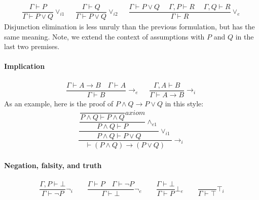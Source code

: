 \begin{align*}
\dfrac{\Gamma \vdash P}
      {\Gamma \vdash P \vee Q}  {\vee_{i1}}
\quad\;
\dfrac{\Gamma \vdash Q}
      {\Gamma \vdash P \vee Q} {\vee_{i2}}
\quad\;
\dfrac{\Gamma \vdash P \vee Q
  \quad\; \Gamma, P \vdash R
  \quad\; \Gamma, Q \vdash R}
      {\Gamma \vdash R} {\vee_{e}}
\end{align*}
%
Disjunction elimination is less unruly than the previous
formulation, but has the same meaning. Note, we extend the
context of assumptions with $P$ and $Q$ in the last two premises.

\paragraph{Implication}

\begin{align*}
\dfrac{\Gamma \vdash A \rightarrow B \quad \Gamma \vdash A}
      {\Gamma \vdash B} {\rightarrow_e}
\quad\;
\dfrac{\Gamma, A \vdash B}{\Gamma \vdash A \rightarrow B}
 {\rightarrow_i}
\end{align*}
As an example, here is the proof of $P \wedge Q \rightarrow P \vee Q$
in this style:
%
\newcommand{\pAB}{\dfrac{}{P \wedge Q \vdash P \wedge Q} {\textit{axiom}}}
\begin{align*}
  \dfrac{
  \dfrac{\dfrac{\pAB}{P \wedge Q \vdash P} {\wedge_{e1}}}
  {P \wedge Q \vdash P \vee Q} {\vee_{i1}}}
  {\vdash (P \wedge Q) \rightarrow (P \vee Q)} {\rightarrow_{i}}
\end{align*}

\paragraph{Negation,  falsity, and truth}

\begin{align*}
  \dfrac{\Gamma, P \vdash \bot}{\Gamma \vdash \neg P} {\neg_i}
  \qquad
  \dfrac{\Gamma \vdash P \quad \Gamma \vdash \neg P}{\Gamma \vdash \bot} {\neg_e}
  \qquad
  \dfrac{\Gamma \vdash \bot}{\Gamma \vdash P} {\bot_e}
  \qquad
  \dfrac{}{\Gamma \vdash \top} {\top_i}
\end{align*}
